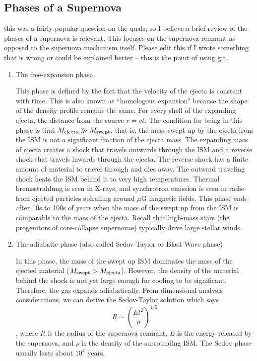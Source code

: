 \subsection{Phases of a Supernova}
 this was a fairly popular question on the quals, so
I believe a brief review of the phases of a supernova is relevant.  This focuses on the
supernova remnant as opposed to the supernova mechanism itself.  Please edit this if I wrote
something that is wrong or could be explained better -- this is the point of using git.
\begin{enumerate}
    \item The free-expansion phase

    This phase is defined by the fact that the velocity of the ejecta is constant with time. This is also known as ``homologous expansion" because the shape of the density profile remains the same. For every shell of the expanding ejecta, the distance from the source $r = vt$. The condition for being in this phase is that $M_{\rm ejecta} \gg M_{\rm swept}$, that is, the mass swept up by the ejecta from the ISM is not a significant fraction of the ejecta mass.
    The expanding mass of ejecta creates a shock that travels outwards through the ISM
    and a reverse shock that travels inwards through the ejecta.  The reverse shock has a finite
    amount of material to travel through and dies away.
    The outward traveling shock heats the ISM behind it to very high temperatures.
    Thermal bremsstrahlung is seen
    in X-rays, and synchrotron emission is seen in radio from ejected
    particles spiralling around $\mu$G magnetic fields.  This phase ends after 10s to 100s of
    years when the mass of the swept up from the ISM is comparable to the mass of the ejecta.
    Recall that high-mass stars (the progenitors of core-collapse supernovae) typically
    drive large stellar winds.

    \item The adiabatic phase (also called Sedov-Taylor or Blast Wave phase)

    In this phase, the mass of the swept up ISM dominates the mass of the ejected material ($M_{\rm swept} > M_{\rm ejecta}$).
    However, the density of the material behind the shock is not yet large enough for cooling
    to be significant.  Therefore, the gas expands adiabatically.
    From dimensional analysis considerations, we can derive the Sedov-Taylor solution which says
    \begin{dmath}
        R \sim \left(\frac{Et^2}{\rho}\right)^{1/5}
    \end{dmath},
    where $R$ is the radius of the supernova remnant, $E$ is the energy released by the
    supernova, and $\rho$ is the density of the surrounding ISM. The Sedov phase usually lasts about $10^4$ years.


\end{enumerate}
